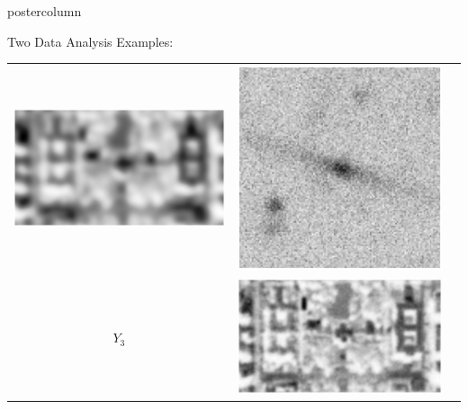 \documentclass[final]{beamer}
\begin{document}
\begin{frame}
\begin{columns}
\begin{column}{.32\textwidth}
\begin{beamercolorbox}[center,wd=\textwidth]{postercolumn}
\begin{minipage}[T]{.95\textwidth}
{\begin{block}{Two Data Analysis Examples: }
\begin{table}
\begin{tabular}{c c c}
\begin{minipage}[c][2.5in][c]{6in}
                    \includegraphics[width=5in,trim=80 130 80 90,clip]{./figures/satelliteWorst.eps}
                  \end{minipage} &
                  \begin{minipage}[c][2.5in][c]{5in}
                    \includegraphics[width=2.7in,trim = 120 50 120 50,clip]{./figures/galaxyPic1.eps}
                  \end{minipage} \\
                  \begin{minipage}[c][2.5in][c]{3cm}
                    $Y_3$
                  \end{minipage} &
                  \begin{minipage}[c][2.5in][c]{6in}
                    \includegraphics[width=5in,trim=80 130 80 90,clip]{./figures/satelliteAvg2.eps}

\end{minipage}
\end{tabular}
\end{table}
\end{block}}
\end{minipage}
\end{beamercolorbox}
\end{column}
\end{columns}
\end{frame}
\end{document}

